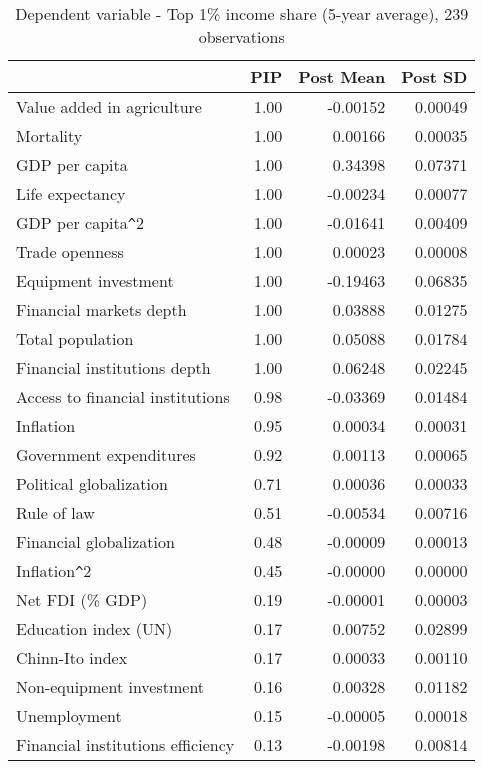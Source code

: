 \documentclass[a4paper,11pt]{article}
\begin{document}
\clearpage
%
\begin{table}[!ht]
    \footnotesize
    \centering
    \caption{Dependent variable - Top 1\% income share (5-year average), 239 observations}
    \label{table:gini1y}
    \begin{tabular}{lrrr}
      \toprule
      & PIP & Post Mean & Post SD \\
      \hline
      Value added in agriculture & 1.00 & -0.00152 & 0.00049 \\
      Mortality & 1.00 & 0.00166 & 0.00035 \\
      GDP per capita & 1.00 & 0.34398 & 0.07371 \\
      Life expectancy & 1.00 & -0.00234 & 0.00077 \\
      GDP per capita\verb|^|2 & 1.00 & -0.01641 & 0.00409 \\
      Trade openness & 1.00 & 0.00023 & 0.00008 \\
      Equipment investment & 1.00 & -0.19463 & 0.06835 \\ 
      Financial markets depth & 1.00 & 0.03888 & 0.01275 \\ 
      Total population & 1.00 & 0.05088 & 0.01784 \\ 
      Financial institutions depth & 1.00 & 0.06248 & 0.02245 \\
      Access to financial institutions & 0.98 & -0.03369 & 0.01484 \\ 
      Inflation & 0.95 & 0.00034 & 0.00031 \\
      Government expenditures & 0.92 & 0.00113 & 0.00065 \\
      Political globalization & 0.71 & 0.00036 & 0.00033 \\ 
      Rule of law & 0.51 & -0.00534 & 0.00716 \\
      Financial globalization & 0.48 & -0.00009 & 0.00013 \\ 
      Inflation\verb|^|2 & 0.45 & -0.00000 & 0.00000 \\
      Net FDI (\% GDP) & 0.19 & -0.00001 & 0.00003 \\ 
      Education index (UN) & 0.17 & 0.00752 & 0.02899 \\
      Chinn-Ito index & 0.17 & 0.00033 & 0.00110 \\ 
      Non-equipment investment & 0.16 & 0.00328 & 0.01182 \\
      Unemployment & 0.15 & -0.00005 & 0.00018 \\
      Financial institutions efficiency & 0.13 & -0.00198 & 0.00814 \\ 

\end{tabular}
\end{table}
\end{document}
